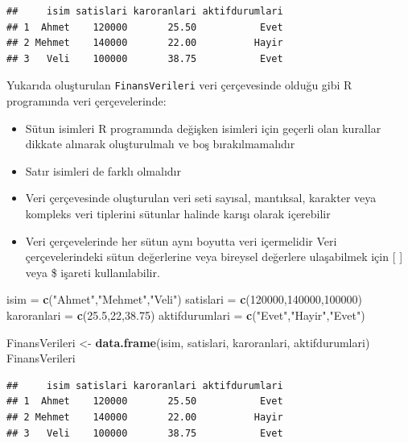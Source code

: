 \documentclass[
]{book}
\newenvironment{Shaded}{\begin{snugshade}}{\end{snugshade}}
\newcommand{\DecValTok}[1]{\textcolor[rgb]{0.00,0.00,0.81}{#1}}
\newcommand{\FloatTok}[1]{\textcolor[rgb]{0.00,0.00,0.81}{#1}}
\newcommand{\FunctionTok}[1]{\textcolor[rgb]{0.13,0.29,0.53}{\textbf{#1}}}
\newcommand{\NormalTok}[1]{#1}
\newcommand{\OtherTok}[1]{\textcolor[rgb]{0.56,0.35,0.01}{#1}}
\newcommand{\StringTok}[1]{\textcolor[rgb]{0.31,0.60,0.02}{#1}}
\providecommand{\tightlist}{%
  \setlength{\itemsep}{0pt}\setlength{\parskip}{0pt}}
\begin{document}
\begin{verbatim}
##     isim satislari karoranlari aktifdurumlari
## 1  Ahmet    120000       25.50           Evet
## 2 Mehmet    140000       22.00          Hayir
## 3   Veli    100000       38.75           Evet
\end{verbatim}

Yukarıda oluşturulan \texttt{FinansVerileri} veri çerçevesinde olduğu gibi R programında veri çerçevelerinde:

\begin{itemize}
\tightlist
\item
  Sütun isimleri R programında değişken isimleri için geçerli olan kurallar dikkate alınarak oluşturulmalı ve boş bırakılmamalıdır
\item
  Satır isimleri de farklı olmalıdır
\item
  Veri çerçevesinde oluşturulan veri seti sayısal, mantıksal, karakter veya kompleks veri tiplerini sütunlar halinde karışı olarak içerebilir
\item
  Veri çerçevelerinde her sütun aynı boyutta veri içermelidir
  Veri çerçevelerindeki sütun değerlerine veya bireysel değerlere ulaşabilmek için {[} {]} veya \$ işareti kullanılabilir.
\end{itemize}

\begin{Shaded}
\begin{Highlighting}[]
\NormalTok{isim }\OtherTok{=} \FunctionTok{c}\NormalTok{(}\StringTok{"Ahmet"}\NormalTok{,}\StringTok{"Mehmet"}\NormalTok{,}\StringTok{"Veli"}\NormalTok{)}
\NormalTok{satislari }\OtherTok{=} \FunctionTok{c}\NormalTok{(}\DecValTok{120000}\NormalTok{,}\DecValTok{140000}\NormalTok{,}\DecValTok{100000}\NormalTok{)}
\NormalTok{karoranlari }\OtherTok{=} \FunctionTok{c}\NormalTok{(}\FloatTok{25.5}\NormalTok{,}\DecValTok{22}\NormalTok{,}\FloatTok{38.75}\NormalTok{)}
\NormalTok{aktifdurumlari }\OtherTok{=} \FunctionTok{c}\NormalTok{(}\StringTok{"Evet"}\NormalTok{,}\StringTok{"Hayir"}\NormalTok{,}\StringTok{"Evet"}\NormalTok{)}

\NormalTok{FinansVerileri }\OtherTok{\textless{}{-}} \FunctionTok{data.frame}\NormalTok{(isim, satislari, karoranlari, aktifdurumlari)}
\NormalTok{FinansVerileri}
\end{Highlighting}
\end{Shaded}

\begin{verbatim}
##     isim satislari karoranlari aktifdurumlari
## 1  Ahmet    120000       25.50           Evet
## 2 Mehmet    140000       22.00          Hayir
## 3   Veli    100000       38.75           Evet
\end{verbatim}
\end{document}
